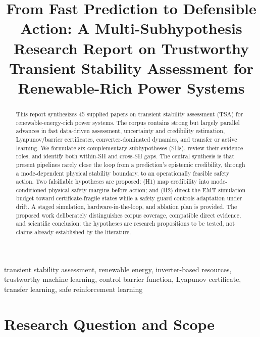 \documentclass[conference]{IEEEtran}
\begin{document}
\title{From Fast Prediction to Defensible Action: A Multi-Subhypothesis Research Report on Trustworthy Transient Stability Assessment for Renewable-Rich Power Systems}

\author{
}

\maketitle

\begin{abstract}
This report synthesizes 45 supplied papers on transient stability assessment (TSA) for renewable-energy-rich power systems. The corpus contains strong but largely parallel advances in fast data-driven assessment, uncertainty and credibility estimation, Lyapunov/barrier certificates, converter-dominated dynamics, and transfer or active learning. We formulate six complementary subhypotheses (SHs), review their evidence roles, and identify both within-SH and cross-SH gaps. The central synthesis is that present pipelines rarely close the loop from a prediction's epistemic credibility, through a mode-dependent physical stability boundary, to an operationally feasible safety action. Two falsifiable hypotheses are proposed: (H1) map credibility into mode-conditioned physical safety margins before action; and (H2) direct the EMT simulation budget toward certificate-fragile states while a safety guard controls adaptation under drift. A staged simulation, hardware-in-the-loop, and ablation plan is provided. The proposed work deliberately distinguishes corpus coverage, compatible direct evidence, and scientific conclusion; the hypotheses are research propositions to be tested, not claims already established by the literature.
\end{abstract}

\begin{IEEEkeywords}
transient stability assessment, renewable energy, inverter-based resources, trustworthy machine learning, control barrier function, Lyapunov certificate, transfer learning, safe reinforcement learning
\end{IEEEkeywords}

\section{Research Question and Scope}
\end{document}
